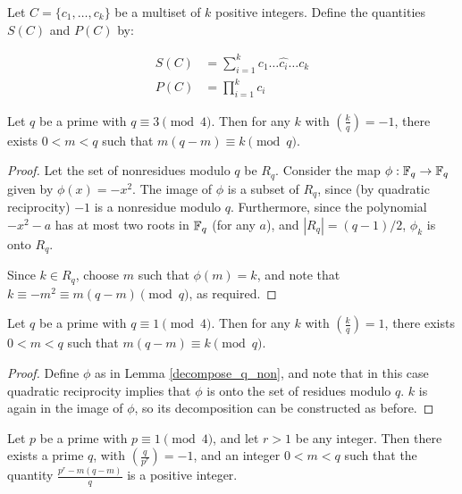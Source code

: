 \documentclass{article}
\begin{document}
\begin{defn}
  Let $C = \{c_1, \ldots, c_k\}$ be a multiset of $k$ positive
  integers. Define the quantities $S(C)$ and $P(C)$ by:

  \begin{align}
    S(C) &= \sum_{i=1}^kc_1 \ldots \hat{c_i} \ldots c_k\\
    P(C) &= \prod_{i=1}^kc_i
  \end{align}

\end{defn}

\begin{lem}
  \label{decompose_q_non}
  Let $q$ be a prime with $q \equiv 3 \pmod 4$. Then for any $k$
  with $\left( \frac{k}{q} \right) = -1$, there exists $0 < m < q$
  such that $m(q-m) \equiv k \pmod q$. 
\end{lem}
\begin{proof}
  Let the set of nonresidues modulo $q$ be $R_q$. Consider the map
  $\phi:\mathbb{F}_q \to \mathbb{F}_q$ given by $\phi(x) = -x^2$. The image of
  $\phi$ is a subset of $R_q$, since (by quadratic reciprocity)
  $-1$ is a nonresidue modulo $q$. Furthermore, since the polynomial
  $-x^2 - a$ has at most two roots in $\mathbb{F}_q$ (for any $a$), and
  $|R_q| = (q - 1)/2$, $\phi_k$ is onto $R_q$. 

  Since $k \in R_q$, choose $m$ such that $\phi(m) = k$, and note
  that $k \equiv -m^2 \equiv m(q-m) \pmod q$, as required.
\end{proof}
\begin{lem}
  \label{decompose_q_res}
  Let $q$ be a prime with $q \equiv 1 \pmod 4$. Then for any $k$
  with $\left( \frac{k}{q} \right) = 1$, there exists $0 < m < q$
  such that $m(q-m) \equiv k \pmod q$.
\end{lem}
\begin{proof}
  Define $\phi$ as in Lemma \ref{decompose_q_non}, and note that in
  this case quadratic reciprocity implies that $\phi$ is onto the
  set of residues modulo $q$. $k$ is again in the image of $\phi$,
  so its decomposition can be constructed as before.
\end{proof}
\begin{prop}
  \label{exist_q}
  Let $p$ be a prime with $p \equiv 1 \pmod 4$, and let $r > 1$ be any
  integer. Then there exists a prime $q$, with $\left( \frac{q}{p^r}
  \right) = -1$, and an integer $0 < m < q$ such that the quantity
  $\frac{p^r - m(q-m)}{q}$ is a positive integer.
\end{prop}
\end{document}
